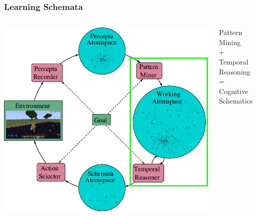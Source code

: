 \documentclass[aspectratio=169]{beamer}
\begin{document}
\begin{frame}
  \frametitle{Learning Schemata}


  \begin{columns}
    \column{3.2in}
    \includegraphics[scale=0.3]{pictures/rocca-chart-learning-highlight-v0.7.png}
    \column{2.5in}
    \begin{center}
      Pattern Mining\\
      +\\
      Temporal Reasoning\\
      =\\
      Cognitive Schematics
    \end{center}
  \end{columns}


\end{frame}
\end{document}
